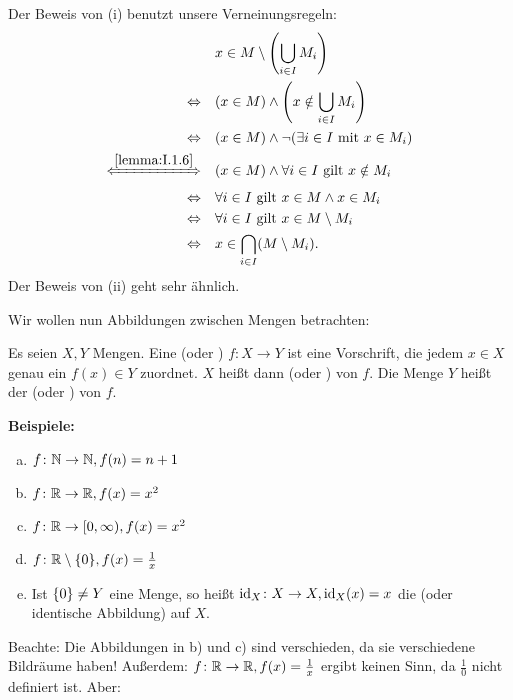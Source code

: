 \begin{beweis}
	Der Beweis von (i) benutzt unsere Verneinungsregeln:
	\begin{align*}
			&x \in M \setminus \enb{\bigcup\limits_{i \in I} M_i} \\
		\Leftrightarrow \quad &(x \in M) \wedge \enb{x \notin \bigcup\limits_{i \in I} M_i} \\
		\Leftrightarrow \quad &(x \in M) \wedge \neg(\exists i \in I \text{ mit } x \in M_i) \\
		\xLeftrightarrow{\ref{lemma:I.1.6}} \quad &(x \in M) \wedge \forall i \in I \text{ gilt } x \notin M_i \\
		\Leftrightarrow \quad &\forall i \in I \text{ gilt } x \in M \wedge x \in M_i \\
		\Leftrightarrow \quad &\forall i \in I \text{ gilt } x \in M \setminus M_i \\
		\Leftrightarrow \quad &x \in \bigcap\limits_{i \in I} (M \setminus M_i).
	\end{align*}
	Der Beweis von (ii) geht sehr ähnlich.
\end{beweis}

Wir wollen nun Abbildungen zwischen Mengen betrachten:

\begin{definition}
	\label{def:I.2.9}
	Es seien $X,Y$ Mengen.
	Eine  (oder ) $f\colon X \rightarrow Y$ ist eine Vorschrift, die jedem $x \in X$ genau ein $f(x) \in Y$ zuordnet.
	$X$ heißt dann  (oder ) von $f$.
	Die Menge $Y$ heißt der  (oder ) von $f$.
\end{definition}
\newpage
\textbf{Beispiele:}
\begin{enumerate}[a)]
	\item $f\colon \mathbb{N} \rightarrow \mathbb{N}, f(n) = n+1$
	\item $f \colon \mathbb{R} \rightarrow \mathbb{R}, f(x) = x^2$
	\item $f \colon \mathbb{R} \rightarrow [0,\infty), f(x) = x^2$
	\item $f \colon \mathbb{R} \setminus \{0\}, f(x) = \frac{1}{x}$
	\item Ist $\{0\} \neq Y$ eine Menge, so heißt $\operatorname{id}_X \colon X \rightarrow X, \operatorname{id}_X(x) = x$ die  (oder identische Abbildung) auf $X$.
\end{enumerate}

Beachte: Die Abbildungen in b) und c) sind verschieden, da sie verschiedene Bildräume haben!
Außerdem: $f \colon \mathbb{R} \rightarrow \mathbb{R}, f(x) = \frac{1}{x}$ ergibt keinen Sinn, da $\frac{1}{0}$ nicht definiert ist. Aber:

